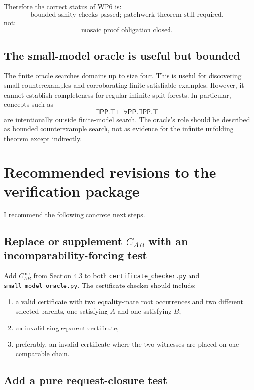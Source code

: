 \documentclass[11pt]{article}
\newcommand{\PP}{\mathsf{PP}}
\newcommand{\true}{\top}
\begin{document}
Therefore the correct status of WP6 is:
\[
\boxed{\text{bounded sanity checks passed; patchwork theorem still required.}}
\]
not:
\[
\text{mosaic proof obligation closed.}
\]

\subsection{The small-model oracle is useful but bounded}

The finite oracle searches domains up to size four.  This is useful for discovering small counterexamples and corroborating finite satisfiable examples.  However, it cannot establish completeness for regular infinite split forests.  In particular, concepts such as
\[
\exists\PP.\true\sqcap\forall\PP.\exists\PP.\true
\]
are intentionally outside finite-model search.  The oracle's role should be described as bounded counterexample search, not as evidence for the infinite unfolding theorem except indirectly.

\section{Recommended revisions to the verification package}

I recommend the following concrete next steps.

\subsection{Replace or supplement \(C_{AB}\) with an incomparability-forcing test}

Add \(C^{\mathrm{inc}}_{AB}\) from Section 4.3 to both \texttt{certificate\_checker.py} and \texttt{small\_model\_oracle.py}.  The certificate checker should include:
\begin{enumerate}
\item a valid certificate with two equality-mate root occurrences and two different selected parents, one satisfying \(A\) and one satisfying \(B\);
\item an invalid single-parent certificate;
\item preferably, an invalid certificate where the two witnesses are placed on one comparable chain.
\end{enumerate}

\subsection{Add a pure request-closure test}
\end{document}
